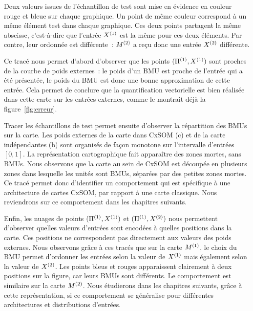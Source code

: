 \documentclass[../main]{subfiles}
\begin{document}
Deux valeurs issues de l'échantillon de test sont mise en évidence en couleur rouge et bleue sur chaque graphique. Un point de même couleur correspond à un même élément test dans chaque graphique. Ces deux points partagent la même abscisse, c'est-à-dire que l'entrée $X^{({1})}$ est la même pour ces deux éléments. Par contre, leur ordonnée est différente~: $M^{({2})}$ a reçu donc une entrée $X^{({2})}$ différente.

Ce tracé nous permet d'abord d'observer que les points $(\Pi^{({1})},X^{({1})})$ sont proches de la courbe de poids externes~: le poids d'un BMU est proche de l'entrée qui a été présentée, le poids du BMU est donc une bonne approximation de cette entrée. Cela permet de conclure que la quantification vectorielle est bien réalisée dans cette carte sur les entrées externes, comme le montrait déjà la figure~\ref{fig:erreur}.

Tracer les échantillons de test permet ensuite d'observer la répartition des BMUs sur la carte. Les poids externes de la carte dans CxSOM (c) et de la carte indépendantes (b) sont organisés de façon monotone sur l'intervalle d'entrées $[0,1]$.
La représentation cartographique fait apparaître des zones mortes, sans BMUs. 
Nous observons que la carte au sein de CxSOM est découpée en plusieurs zones dans lesquelle les unités sont BMUs, séparées par des petites zones mortes. Ce tracé permet donc d'identifier un comportement qui est spécifique à une architecture de cartes CxSOM, par rapport à une carte classique. Nous reviendrons sur ce comportement dans les chapitres suivants.

Enfin, les nuages de points $(\Pi^{({1})},X^{({1})})$ et $(\Pi^{({1})},X^{({2})})$ nous permettent d'observer quelles valeurs d'entrées sont encodées à quelles positions dans la carte. Ces positions ne correspondent pas directement aux valeurs des poids externes.
Nous observons grâce à ces tracés que sur la carte $M^{({1})}$, le choix du BMU permet d'ordonner les entrées selon la valeur de $X^{({1})}$ mais également selon la valeur de $X^{({2})}$. 
Les points bleus et rouges apparaissent clairement à deux positions sur la figure, car leurs BMUs sont différents.
Le comportement est similaire sur la carte $M^{({2})}$.
Nous étudierons dans les chapitres suivants, grâce à cette représentation, si ce comportement se généralise pour différentes architectures et distributions d'entrées.
\end{document}
